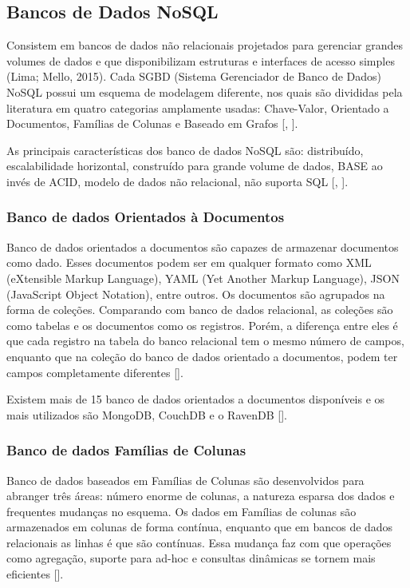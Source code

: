\clearpage


\subsection{Bancos de Dados NoSQL}

Consistem em bancos de dados não relacionais projetados para gerenciar grandes volumes de dados e que disponibilizam estruturas e interfaces de acesso simples (Lima; Mello, 2015). Cada SGBD (Sistema Gerenciador de Banco de Dados) NoSQL possui um esquema de modelagem diferente, nos quais são divididas pela literatura em quatro categorias amplamente usadas: Chave-Valor, Orientado a Documentos, Famílias de Colunas e Baseado em Grafos [\cite{fowler:2013}, \cite{kaur:2013}].

As principais características dos banco de dados NoSQL são: distribuído, escalabilidade horizontal, construído para grande volume de dados, BASE ao invés de ACID, modelo de dados não relacional, não suporta SQL [\cite{fowler:2013}, \cite{nasholm:2012}].

\subsubsection{Banco de dados Orientados à Documentos}

Banco de dados orientados a documentos são capazes de armazenar documentos como dado. Esses documentos podem ser em qualquer formato como XML (eXtensible Markup Language), YAML (Yet Another Markup Language), JSON (JavaScript Object Notation), entre outros. Os documentos são agrupados na forma de coleções. Comparando com banco de dados relacional, as coleções são como tabelas e os documentos como os registros. Porém, a diferença entre eles é que cada registro na tabela do banco relacional tem o mesmo número de campos, enquanto que na coleção do banco de dados orientado a documentos, podem ter campos completamente diferentes [\cite{kaur:2013}].

Existem mais de 15 banco de dados orientados a documentos disponíveis e os mais utilizados são MongoDB, CouchDB e o RavenDB [\cite{kaur:2013}].

\subsubsection{Banco de dados Famílias de Colunas}

Banco de dados baseados em Famílias de Colunas são desenvolvidos para abranger três áreas: número enorme de colunas, a natureza esparsa dos dados e frequentes mudanças no esquema. Os dados em Famílias de colunas são armazenados em colunas de forma contínua, enquanto que em bancos de dados relacionais as linhas é que são contínuas. Essa mudança faz com que operações como agregação, suporte para ad-hoc e consultas dinâmicas se tornem mais eficientes [\cite{kaur:2013}].

